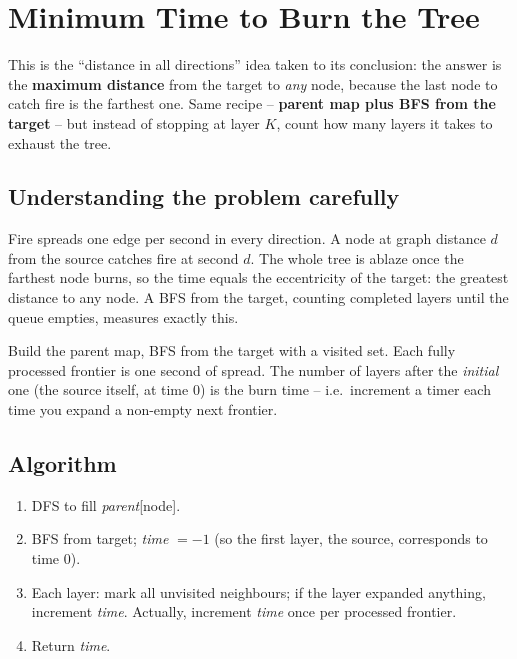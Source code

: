\section{Minimum Time to Burn the Tree}
\label{sec:trees-burn}


\begin{patternbox}
This is the ``distance in all directions'' idea taken to its conclusion:
the answer is the \textbf{maximum distance} from the target to \emph{any}
node, because the last node to catch fire is the farthest one. Same
recipe -- \textbf{parent map plus BFS from the target} -- but instead of
stopping at layer $K$, count how many layers it takes to exhaust the tree.
\end{patternbox}

\subsection*{Understanding the problem carefully}

Fire spreads one edge per second in every direction. A node at graph
distance $d$ from the source catches fire at second $d$. The whole tree is
ablaze once the farthest node burns, so the time equals the eccentricity
of the target: the greatest distance to any node. A BFS from the target,
counting completed layers until the queue empties, measures exactly this.

\begin{ideabox}[Answer = Number of BFS Layers to Empty the Tree]
Build the parent map, BFS from the target with a visited set. Each fully
processed frontier is one second of spread. The number of layers after the
\emph{initial} one (the source itself, at time $0$) is the burn time --
i.e.\ increment a timer each time you expand a non-empty next frontier.
\end{ideabox}

\subsection*{Algorithm}

\begin{enumerate}
  \item DFS to fill \textit{parent}[node].
  \item BFS from target; \textit{time} $=-1$ (so the first layer, the
        source, corresponds to time $0$).
  \item Each layer: mark all unvisited neighbours; if the layer expanded
        anything, increment \textit{time}. Actually, increment
        \textit{time} once per processed frontier.
  \item Return \textit{time}.
\end{enumerate}

